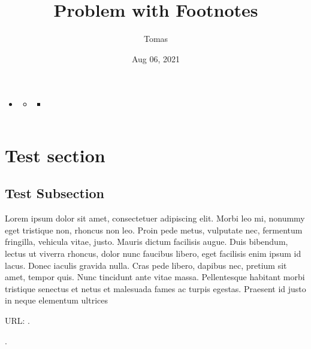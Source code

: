 \documentclass[a4paper,10pt,openany,oneside,english]{sphinxmanual}
\title{Problem with Footnotes}
\date{Aug 06, 2021}
\author{Tomas}
\begin{document}
\pagestyle{empty}
\sphinxmaketitle
\pagestyle{plain}
\sphinxtableofcontents
\pagestyle{normal}
\label{\detokenize{guides/operational/cso/footnotes::doc}}


\begin{sphinxShadowBox}
\begin{itemize}
\item {} 
\sphinxAtStartPar
{}\label{\detokenize{guides/operational/cso/footnotes:id3}}{\hyperref[\detokenize{guides/operational/cso/footnotes:footnotes}]{}}
\begin{itemize}
\item {} 
\sphinxAtStartPar
{}\label{\detokenize{guides/operational/cso/footnotes:id4}}{\hyperref[\detokenize{guides/operational/cso/footnotes:test-section}]{}}
\begin{itemize}
\item {} 
\sphinxAtStartPar
{}\label{\detokenize{guides/operational/cso/footnotes:id5}}{\hyperref[\detokenize{guides/operational/cso/footnotes:test-subsection}]{}}

\end{itemize}

\end{itemize}

\end{itemize}
\end{sphinxShadowBox}


\chapter{Test section}
\label{\detokenize{guides/operational/cso/footnotes:test-section}}

\section{Test Subsection}
\label{\detokenize{guides/operational/cso/footnotes:test-subsection}}
\sphinxAtStartPar
Lorem ipsum dolor sit amet, consectetuer adipiscing elit. Morbi leo mi, nonummy eget tristique non, rhoncus non leo.
Proin pede metus, vulputate nec, fermentum fringilla, vehicula vitae, justo. Mauris dictum facilisis augue. Duis bibendum,
lectus ut viverra rhoncus, dolor nunc faucibus libero, eget facilisis enim ipsum id lacus. Donec iaculis gravida nulla.
Cras pede libero, dapibus nec, pretium sit amet, tempor quis. Nunc tincidunt ante vitae massa. Pellentesque habitant
morbi tristique senectus et netus et malesuada fames ac turpis egestas.
Praesent id justo in neque elementum ultrices %
\begin{footnote}[1]\sphinxAtStartFootnote
URL: .
%
\end{footnote}.
\end{document}
